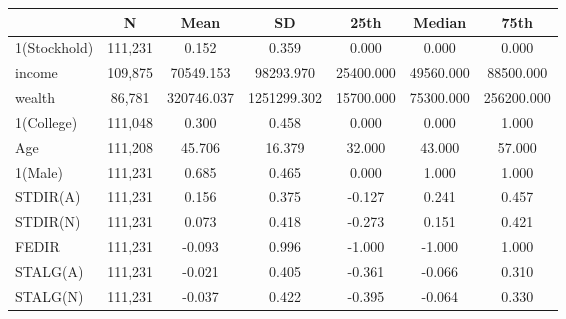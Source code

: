{
\def\sym#1{\ifmmode^{#1}\else\(^{#1}\)\fi}
\begin{tabular*}{\textwidth}{l@{\extracolsep{\fill}}*{6}{c}}
\toprule
          &        N&     Mean&       SD&     25th&   Median&     75th\\
\midrule
1(Stockhold)&  111,231&    0.152&    0.359&    0.000&    0.000&    0.000\\
income    &  109,875&70549.153&98293.970&25400.000&49560.000&88500.000\\
wealth    &   86,781&320746.037&1251299.302&15700.000&75300.000&256200.000\\
1(College)&  111,048&    0.300&    0.458&    0.000&    0.000&    1.000\\
Age       &  111,208&   45.706&   16.379&   32.000&   43.000&   57.000\\
1(Male)   &  111,231&    0.685&    0.465&    0.000&    1.000&    1.000\\
STDIR(A)  &  111,231&    0.156&    0.375&   -0.127&    0.241&    0.457\\
STDIR(N)  &  111,231&    0.073&    0.418&   -0.273&    0.151&    0.421\\
FEDIR     &  111,231&   -0.093&    0.996&   -1.000&   -1.000&    1.000\\
STALG(A)  &  111,231&   -0.021&    0.405&   -0.361&   -0.066&    0.310\\
STALG(N)  &  111,231&   -0.037&    0.422&   -0.395&   -0.064&    0.330\\
\bottomrule
\end{tabular*}
}
